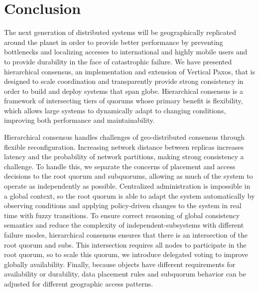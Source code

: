 \documentclass[10pt,conference]{IEEEtran}
\newcommand{\hc}{hierarchical consensus\xspace}
\newcommand{\Hc}{Hierarchical consensus\xspace}
\newcommand{\subs}{subquorums\xspace}
\newcommand{\roo}{root quorum\xspace}
\begin{document}
\section{Conclusion}
\label{section:conclusion}

The next generation of distributed systems will be geographically replicated around the
planet in order to provide better performance by preventing bottlenecks and localizing
accesses to international and highly mobile users and to provide durability in the face
of catastrophic failure.
We have presented \hc, an implementation and extension of Vertical Paxos, that is
designed to scale coordination and transparently provide strong consistency in order to
build and deploy systems that span globe.
\Hc is a framework of intersecting tiers of quorums whose primary benefit is flexibility,
which allows large systems to dynamically adapt to changing conditions, improving both
performance and maintainability.

\Hc handles challenges of geo-distributed consensus through flexible reconfiguration.
Increasing network distance between replicas increases latency and the probability of
network partitions, making strong consistency a challenge.
To handle this, we separate the concerns of placement and access decisions to the \roo
and \subs, allowing as much of the system to operate as independently as possible.
Centralized administration is impossible in a global context, so the \roo is able to
adapt the system automatically by observing conditions and applying policy-driven
changes to the system in real time with fuzzy transitions.
To ensure correct reasoning of global consistency semantics and reduce the complexity of
independent-subsystems with different failure modes, \hc ensures that there is an
intersection of the \roo and subs.
This intersection requires all nodes to participate in the root quorum, so to scale
this quorum, we introduce delegated voting to improve globally availability.
Finally, because objects have different requirements for availability or durability,
data placement rules and subquorum behavior can be adjusted for different geographic
access patterns.





\end{document}
